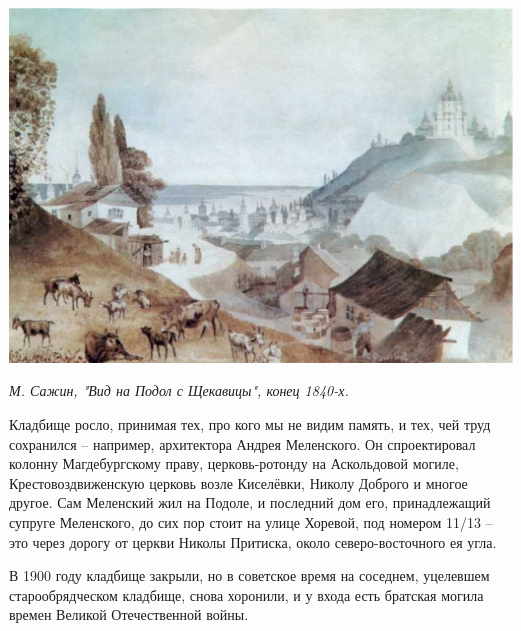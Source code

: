 \newpage







\begin{center}
\includegraphics[width=\linewidth]{chast-colebanie-osnov/sheka/sajin-vid-s-shekavici.jpg}

\textit{М. Сажин, "Вид на Подол с Щекавицы", конец 1840-х.}
\end{center}


Кладбище росло, принимая тех, про кого мы не видим память, и тех, чей труд сохранился – например, архитектора Андрея Меленского. Он спроектировал колонну Магдебургскому праву, церковь-ротонду на Аскольдовой могиле, Крестовоздвиженскую церковь возле Киселёвки, Николу Доброго и многое другое. Сам Меленский жил на Подоле, и последний дом его, принадлежащий супруге Меленского, до сих пор стоит на улице Хоревой, под номером 11/13 – это через дорогу от церкви Николы Притиска, около северо-восточного ея угла.

В 1900 году кладбище закрыли, но в советское время на соседнем, уцелевшем старообрядческом кладбище, снова хоронили, и у входа есть братская могила времен Великой Отечественной войны.

